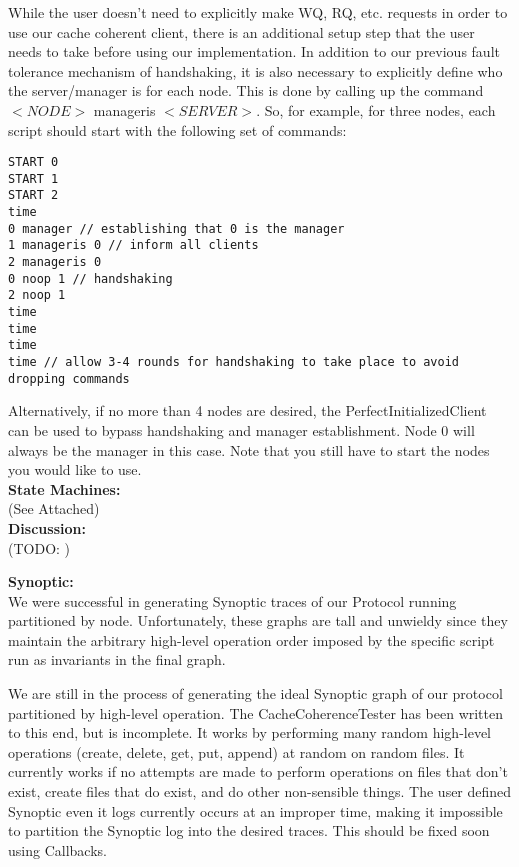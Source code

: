 \documentclass[11pt]{article}
\begin{document}
While the user doesn’t need to explicitly make WQ, RQ, etc. requests in order to use our cache coherent client, there is an additional setup step 
that the user needs to take before using our implementation. In addition to our previous fault tolerance mechanism of handshaking, it is also necessary 
to explicitly define who the server/manager is for each node. This is done by calling up the command $<NODE>$ manageris $<SERVER>$. So, for example, for three 
nodes, each script should start with the following set of commands:\\

\begin{verbatim}
START 0
START 1
START 2
time
0 manager // establishing that 0 is the manager
1 manageris 0 // inform all clients
2 manageris 0
0 noop 1 // handshaking
2 noop 1
time
time
time
time // allow 3-4 rounds for handshaking to take place to avoid dropping commands
\end{verbatim}

Alternatively, if no more than 4 nodes are desired, the PerfectInitializedClient can be used to bypass handshaking and manager establishment.
Node 0 will always be the manager in this case. Note that you still have to start the nodes you would like to use. \\

\textbf{State Machines:} \\

(See Attached) \\

\textbf{Discussion:}\\

(TODO: )

\textbf{Synoptic:} \\

We were successful in generating Synoptic traces of our Protocol running partitioned by node. Unfortunately, these graphs are tall and unwieldy since they
maintain the arbitrary high-level operation order imposed by the specific script run as invariants in the final graph.

We are still in the process of generating the ideal Synoptic graph of our protocol partitioned by high-level operation. The CacheCoherenceTester has been written to this end, but is incomplete.
It works by performing many random high-level operations (create, delete, get, put, append) at random on random files. It currently works if no attempts are made to
perform operations on files that don't exist, create files that do exist, and do other non-sensible things. The user defined Synoptic even it logs currently occurs at
an improper time, making it impossible to partition the Synoptic log into the desired traces. This should be fixed soon using Callbacks.
\end{document}
